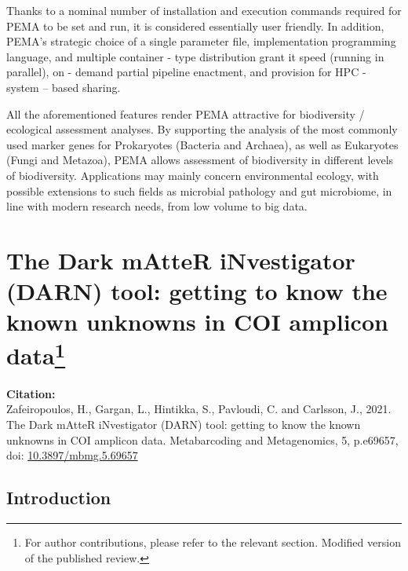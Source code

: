    Thanks to a nominal number of installation and execution commands required for PEMA to be set and run, it is considered essentially user friendly. 
   In addition, PEMA's strategic choice of a single parameter file, implementation programming language, and multiple container - type distribution grant it speed (running in parallel), on - demand partial pipeline enactment, and provision for HPC - system – based sharing.

   All the aforementioned features render PEMA attractive for biodiversity / ecological assessment analyses. 
   By supporting the analysis of the most commonly used marker genes for Prokaryotes (Bacteria and Archaea), as well as Eukaryotes (Fungi and Metazoa), PEMA allows assessment of biodiversity in different levels of biodiversity. 
   Applications may mainly concern environmental ecology, with possible extensions to such fields as microbial pathology and gut microbiome, in line with modern research needs, from low volume to big data.



\newpage


% 
% 

\newpage

\section[The Dark mAtteR iNvestigator (DARN) tool: getting to know the known unknowns in COI amplicon data]{
   The Dark mAtteR iNvestigator (DARN) tool: getting to know the known unknowns in COI amplicon data\footnote{
      For author contributions, please refer to the relevant section. Modified version of the published review.
   }
}

\textbf{Citation:} \\
Zafeiropoulos, H., Gargan, L., Hintikka, S., Pavloudi, C. and Carlsson, J., 2021. The Dark mAtteR iNvestigator (DARN) tool: getting to know the known unknowns in COI amplicon data. Metabarcoding and Metagenomics, 5, p.e69657, \\
doi: \href{https://doi.org/10.3897/mbmg.5.69657}{10.3897/mbmg.5.69657}

   \subsection{Introduction}



